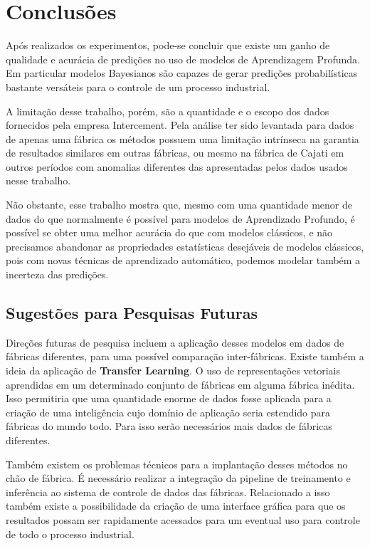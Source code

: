 \chapter{Conclusões}
\label{cap:conclusoes}


Após realizados os experimentos, pode-se concluir que existe um ganho de
qualidade e acurácia de predições no uso de modelos de Aprendizagem
Profunda. Em particular modelos Bayesianos são capazes de gerar predições
probabilísticas bastante versáteis para o controle de um processo industrial.

A limitação desse trabalho, porém, são a quantidade e o escopo dos dados
fornecidos pela empresa Intercement. Pela análise ter sido levantada para dados
de apenas uma fábrica os métodos possuem uma limitação intrínseca na garantia de
resultados similares em outras fábricas, ou mesmo na fábrica de Cajati em
outros períodos com anomalias diferentes das apresentadas pelos dados usados
nesse trabalho.

Não obstante, esse trabalho mostra que, mesmo com uma quantidade menor de dados
do que normalmente é possível para modelos de Aprendizado Profundo, é possível
se obter uma melhor acurácia do que com modelos clássicos, e não precisamos
abandonar as propriedades estatísticas desejáveis de modelos clássicos, pois com
novas técnicas de aprendizado automático, podemos modelar também a incerteza das predições.


\section{Sugestões para Pesquisas Futuras} 

Direções futuras de pesquisa incluem a aplicação desses modelos em dados
de fábricas diferentes, para uma possível comparação inter-fábricas. Existe
também a ideia da aplicação de \textbf{Transfer Learning}. O uso de
representações vetoriais aprendidas em um determinado conjunto de fábricas em
alguma fábrica inédita. Isso permitiria que uma quantidade enorme de dados fosse
aplicada para a criação de uma inteligência cujo domínio de aplicação seria
estendido para fábricas do mundo todo. Para isso serão necessários mais dados de
fábricas diferentes.

Também existem os problemas técnicos para a implantação desses métodos no chão
de fábrica. É necessário realizar a integração da pipeline de treinamento e inferência ao sistema de
controle de dados das fábricas. Relacionado a isso também existe a possibilidade
da criação de uma interface gráfica para que os resultados possam ser rapidamente acessados
para um eventual uso para controle de todo o processo industrial. 


